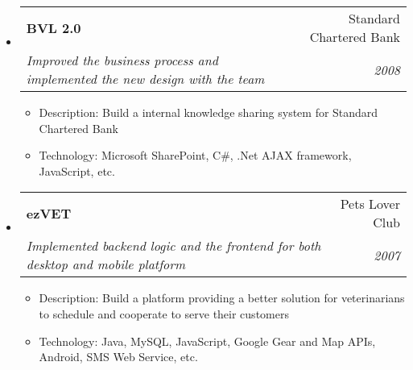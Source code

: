 \documentclass[twoside,letterpaper,11pt]{article}
\makeatletter
\newcommand{\resitem}[1]{\item #1 \vspace{-5pt}}
\newcommand{\ressubheading}[4]{
\begin{tabular*}{7in}{l@{\extracolsep{\fill}}r}
		\textbf{#1} & #2 \\
		\textit{#3} & \textit{#4} \\
\end{tabular*}\vspace{-6pt}}
\makeatother
\begin{document}
\begin{itemize}
\item
	\ressubheading{BVL 2.0}{Standard Chartered Bank}{Improved the business process and implemented the new design with the team}{2008}
	\begin{itemize}
		\resitem{Description: Build a internal knowledge sharing system for Standard Chartered Bank}
		\resitem{Technology: Microsoft SharePoint, C\#, .Net AJAX framework, JavaScript, etc.}
	\end{itemize}
\newpage
{}
\item
	\ressubheading{ezVET}{Pets Lover Club}{Implemented backend logic and the frontend for both desktop and mobile platform
}{2007}
	\begin{itemize}
		\resitem{Description: Build a platform providing a better solution for veterinarians to schedule and cooperate to serve their customers}
		\resitem{Technology: Java, MySQL, JavaScript, Google Gear and Map APIs, Android, SMS Web Service, etc.}
	\end{itemize}
\end{itemize}
\end{document}
